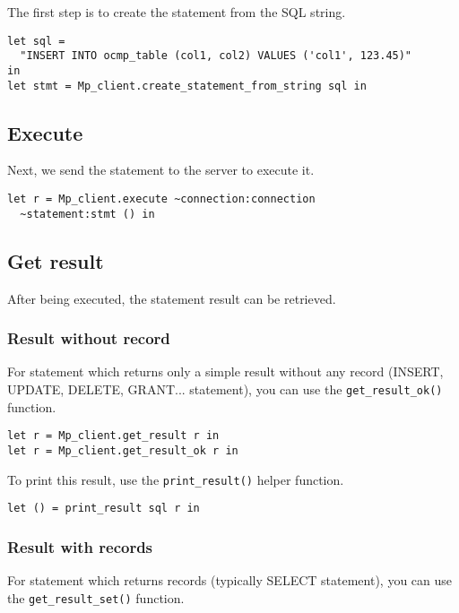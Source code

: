 \documentclass[a4paper, english, 11pt]{article}
\begin{document}
The first step is to create the statement from the SQL string.

\begin{verbatim}
let sql =
  "INSERT INTO ocmp_table (col1, col2) VALUES ('col1', 123.45)"
in
let stmt = Mp_client.create_statement_from_string sql in
\end{verbatim}

\subsection{Execute}

Next, we send the statement to the server to execute it.

\begin{verbatim}
let r = Mp_client.execute ~connection:connection 
  ~statement:stmt () in
\end{verbatim}

\subsection{Get result}

After being executed, the statement result can be retrieved.

\subsubsection{Result without record}

For statement which returns only a simple result without any record (INSERT, UPDATE, DELETE, GRANT... statement), you can use the \texttt{get\_result\_ok()} function.

\begin{verbatim}
let r = Mp_client.get_result r in
let r = Mp_client.get_result_ok r in
\end{verbatim}

To print this result, use the \texttt{print\_result()} helper function.

\begin{verbatim}
let () = print_result sql r in
\end{verbatim}

\subsubsection{Result with records}

For statement which returns records (typically SELECT statement), you can use the \texttt{get\_result\_set()} function.
\end{document}
